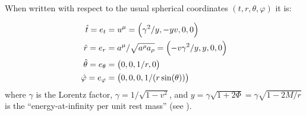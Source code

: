 \documentclass[main.tex]{subfiles}
\begin{document}
\begin{claim}
When written with respect to the usual spherical coordinates \((t, r, \theta, \varphi)\) it is:

\begin{subequations} \label{eq:fiducial-frame}
    \begin{align}
        \hat{t} = e_t &= u^\mu = \qty(\gamma^2 / y, -yv, 0,0)  \\
        \hat{r} = e_r &= a^\mu / \sqrt{a^\rho a_\rho} = \qty(-v \gamma^2 /y, y, 0, 0) \\
        \hat{\theta} =  e_\theta &= \qty(0,0, 1/r, 0)  \\
        \hat{\varphi} =  e_ \varphi &= \qty(0,0,0, 1/(r \sin(\theta)))
    \end{align}
\end{subequations}
where \(\gamma\) is the Lorentz factor, $\gamma = 1/\sqrt{1-v^2}$, and $y=\gamma \sqrt{1+2\Phi} = \gamma \sqrt{1 - 2M/r} $ is the ``energy-at-infinity per unit rest mass'' (see \cite[equation 3]{ThorneFLammmangZytkow:1981feb}).
\end{claim}
\end{document}
